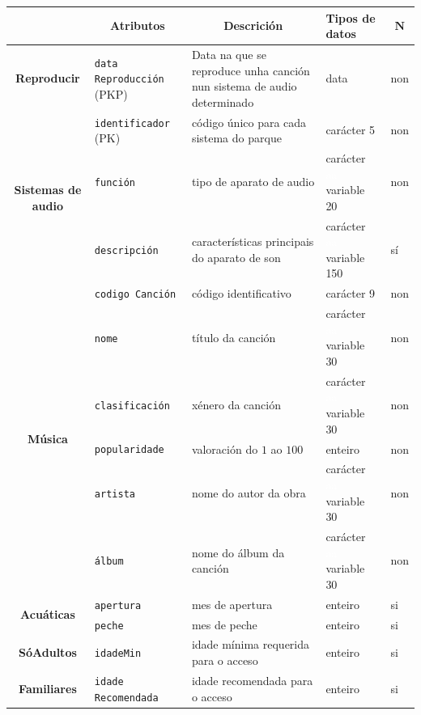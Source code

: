 \documentclass[12pt,a4paper]{book}
\theoremstyle{definition}
\theoremstyle{break}
\begin{document}
\newpage

\begin{table} [H] \centering
	\begin{tabular}{|c|m{3cm}|m{4cm}|m{2cm}|m{0.7cm}|}
		\hline \rowcolor{gris}
		\multicolumn{1}{|m{2.5cm}|}{Entidade ou relación} & \multicolumn{1}{c|}{Atributos} & \multicolumn{1}{c|}{Descrición} & \multicolumn{1}{m{2cm}|}{Tipos de datos} & \multicolumn{1}{c|}{$\mathbf{N}$} \\
		\hline
		\textbf{Reproducir} & \texttt{data Reproducción} (PKP) & Data na que se reproduce unha canción nun sistema de audio determinado & data & non\\
		\hline
		\multirow{3}{*}{\textbf{Sistemas de audio}} & \texttt{identificador} (PK) & código único para cada sistema do parque & carácter 5 & non\\
		\cline{2-5}
		&\texttt{función} & tipo de aparato de audio &  carácter \textcolor{white}{aa} variable 20 & non\\
		\cline{2-5}
		& \texttt{descripción} & características principais do aparato de son &  carácter \textcolor{white}{aa} variable 150 & sí\\
		\cline{2-5}
		\hline
		\multirow{6}{*}{\textbf{Música}} & \texttt{codigo Canción} & código identificativo & carácter 9 & non\\
		\cline{2-5}
		& \texttt{nome} & título da canción &  carácter \textcolor{white}{aa} variable 30 & non\\
		\cline{2-5}
		&\texttt{clasificación} & xénero da canción &  carácter \textcolor{white}{aa} variable 30 & non\\
		\cline{2-5}
		& \texttt{popularidade} & valoración do $1$ ao $100$ & enteiro & non\\
		\cline{2-5}
		& \texttt{artista} & nome do autor da obra &  carácter \textcolor{white}{aa} variable 30 & non\\
		\cline{2-5}
		& \texttt{álbum} & nome do álbum da canción &  carácter \textcolor{white}{aa} variable 30 & non\\
		\hline
		\multirow{2}{*}{\textbf{Acuáticas}} & \texttt{apertura} & mes de apertura & enteiro & si\\
		\cline{2-5}
		& \texttt{peche} & mes de peche & enteiro & si\\
		\hline
		\textbf{SóAdultos} & \texttt{idadeMin} & idade mínima requerida para o acceso & enteiro & si\\
		\hline
		\textbf{Familiares} & \texttt{idade Recomendada } & idade recomendada para o acceso & enteiro & si\\
		\hline 
		
	\end{tabular}
\end{table}
\end{document}
